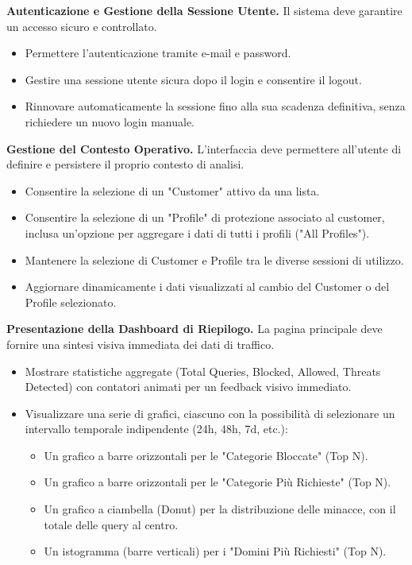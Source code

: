\documentclass[12pt,a4paper,openright,twoside]{book}
\begin{document}
\begin{reqfunz}
    \item \label{req:auth} \textbf{Autenticazione e Gestione della Sessione Utente.} Il sistema deve garantire un accesso sicuro e controllato.
          \begin{itemize}
              \item Permettere l'autenticazione tramite e-mail e password.
              \item Gestire una sessione utente sicura dopo il login e consentire il logout.
              \item Rinnovare automaticamente la sessione fino alla sua scadenza definitiva, senza richiedere un nuovo login manuale.
          \end{itemize}

    \item \label{req:context} \textbf{Gestione del Contesto Operativo.} L'interfaccia deve permettere all'utente di definire e persistere il proprio contesto di analisi.
          \begin{itemize}
              \item Consentire la selezione di un "Customer" attivo da una lista.
              \item Consentire la selezione di un "Profile" di protezione associato al customer, inclusa un'opzione per aggregare i dati di tutti i profili ("All Profiles").
              \item Mantenere la selezione di Customer e Profile tra le diverse sessioni di utilizzo.
              \item Aggiornare dinamicamente i dati visualizzati al cambio del Customer o del Profile selezionato.
          \end{itemize}

    \item \label{req:dashboard} \textbf{Presentazione della Dashboard di Riepilogo.} La pagina principale deve fornire una sintesi visiva immediata dei dati di traffico.
          \begin{itemize}
              \item Mostrare statistiche aggregate (Total Queries, Blocked, Allowed, Threats Detected) con contatori animati per un feedback visivo immediato.
              \item Visualizzare una serie di grafici, ciascuno con la possibilità di selezionare un intervallo temporale indipendente (24h, 48h, 7d, etc.):
                    \begin{itemize}
                        \item Un grafico a barre orizzontali per le "Categorie Bloccate" (Top N).
                        \item Un grafico a barre orizzontali per le "Categorie Più Richieste" (Top N).
                        \item Un grafico a ciambella (Donut) per la distribuzione delle minacce, con il totale delle query al centro.
                        \item Un istogramma (barre verticali) per i "Domini Più Richiesti" (Top N).
                    \end{itemize}
          \end{itemize}


\end{reqfunz}
\end{document}
